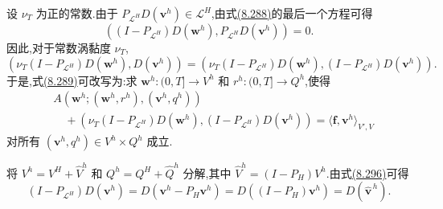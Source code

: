 \begin{note}[常数附加涡黏度下的等价形式]
\label{note:vms-coarse-projection-constant-viscosity}
设 $\nu_T$ 为正的常数.由于 $P_{\mathcal L^H}D(\bm v^h)\in\mathcal L^H$,由式\hyperref[eq:vms-coarse-projection-three-scale-method]{(8.288)}的最后一个方程可得
\[
 ((I-P_{\mathcal L^H})D(\bm w^h),
     P_{\mathcal L^H}D(\bm v^h))=0.
\]
因此,对于常数涡黏度 $\nu_T$,
\[
 (\nu_T(I-P_{\mathcal L^H})D(\bm w^h),D(\bm v^h))
 =
 (\nu_T(I-P_{\mathcal L^H})D(\bm w^h),
     (I-P_{\mathcal L^H})D(\bm v^h)).
\]
于是,式\hyperref[eq:vms-coarse-projection-short-form]{(8.289)}可改写为:求
$\bm w^h:(0,T]\to V^h$ 和 $r^h:(0,T]\to Q^h$,使得
\begin{equation}\label{eq:vms-coarse-projection-constant-form}
\begin{aligned}
 &A(\bm w^h;(\bm w^h,r^h),(\bm v^h,q^h))\\
 &\quad+
 (\nu_T(I-P_{\mathcal L^H})D(\bm w^h),
             (I-P_{\mathcal L^H})D(\bm v^h))
 =\langle\bm f,\bm v^h\rangle_{V',V}
\end{aligned}
\end{equation}
对所有 $(\bm v^h,q^h)\in V^h\times Q^h$ 成立.

将 $V^h=V^H+\widehat V^h$ 和 $Q^h=Q^H+\widehat Q^h$ 分解,其中
$\widehat V^h=(I-P_H)V^h$.由式\hyperref[eq:vms-coarse-projection-commutation]{(8.296)}可得
\[
 (I-P_{\mathcal L^H})D(\bm v^h)
 =D(\bm v^h-P_H\bm v^h)
 =D((I-P_H)\bm v^h)
 =D(\widehat{\bm v}^{\,h}).
\]


\end{note}
